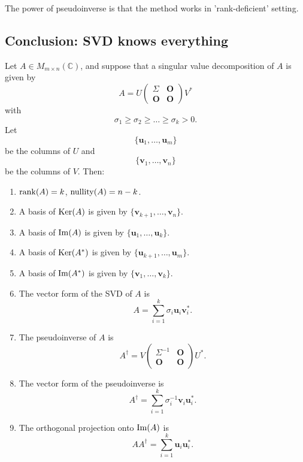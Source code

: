\begin{remark}
    The power of pseudoinverse is that the method works in 'rank-deficient' setting.
\end{remark}




\subsection{Conclusion: SVD knows everything}

\begin{theorem}
Let $A\in M_{m\times n}(\mathbb{C})$, and suppose that a singular value decomposition of $A$ is given by
\[
A
=
U
\begin{pmatrix}
\Sigma & \mathbf{O}\\
\mathbf{O} & \mathbf{O}
\end{pmatrix}
V^*
\]
with
\[
\sigma_1\ge \sigma_2\ge \dots \ge \sigma_k>0.
\]
Let
\[
\{\mathbf{u}_1,\dots,\mathbf{u}_m\}
\]
be the columns of $U$ and
\[
\{\mathbf{v}_1,\dots,\mathbf{v}_n\}
\]
be the columns of $V$. Then:
\begin{enumerate}
    \item[(a)] $\operatorname{rank}(A)=k$, $\operatorname{nullity}(A)=n-k$.
    \item[(b)] A basis of $\operatorname{Ker}(A)$ is given by $\{\mathbf{v}_{k+1},\dots,\mathbf{v}_n\}$.
    \item[(c)] A basis of $\operatorname{Im}(A)$ is given by $\{\mathbf{u}_1,\dots,\mathbf{u}_k\}$.
    \item[(d)] A basis of $\operatorname{Ker}(A^*)$ is given by $\{\mathbf{u}_{k+1},\dots,\mathbf{u}_m\}$.
    \item[(e)] A basis of $\operatorname{Im}(A^*)$ is given by $\{\mathbf{v}_1,\dots,\mathbf{v}_k\}$.
    \item[(f)] The vector form of the SVD of $A$ is
    \[
    A=\sum_{i=1}^k \sigma_i\mathbf{u}_i\mathbf{v}_i^*.
    \]
    \item[(g)] The pseudoinverse of $A$ is
    \[
    A^\dagger
    =
    V
    \begin{pmatrix}
    \Sigma^{-1} & \mathbf{O}\\
    \mathbf{O} & \mathbf{O}
    \end{pmatrix}
    U^*.
    \]
    \item[(h)] The vector form of the pseudoinverse is
    \[
    A^\dagger
    =
    \sum_{i=1}^k \sigma_i^{-1}\mathbf{v}_i\mathbf{u}_i^*.
    \]
    \item[(i)] The orthogonal projection onto $\operatorname{Im}(A)$ is
    \[
    AA^\dagger
    =
    \sum_{i=1}^k \mathbf{u}_i\mathbf{u}_i^*.
\]
\end{enumerate}
\end{theorem}
